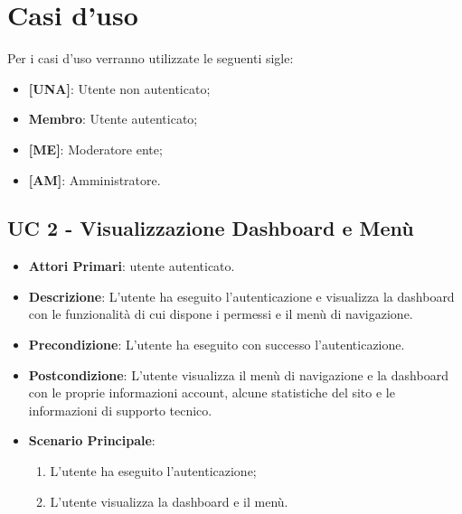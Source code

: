 \section{Casi d'uso}
	Per i casi d'uso verranno utilizzate le seguenti sigle:
	\begin{itemize}
		\item \textbf{[UNA]}: Utente non autenticato;
		\item \textbf{Membro}: Utente autenticato;
		\item \textbf{[ME]}: Moderatore ente;
		\item \textbf{[AM]}: Amministratore.
	\end{itemize}

		

		
		

		\subsection{UC 2 - Visualizzazione Dashboard e Menù}
		
		\begin{itemize}
			\item \textbf{Attori Primari}: utente autenticato.
			\item \textbf{Descrizione}: L'utente ha eseguito l'autenticazione e visualizza la dashboard con le funzionalità di cui dispone i permessi e il menù di navigazione.
			\item \textbf{Precondizione}: L'utente ha eseguito con successo l'autenticazione.
			\item \textbf{Postcondizione}: L'utente visualizza il menù di navigazione e la dashboard con le proprie informazioni account, alcune statistiche del sito e le informazioni di supporto tecnico.
			\item \textbf{Scenario Principale}:
			\begin{enumerate}
				\item L'utente ha eseguito l'autenticazione;
				\item L'utente visualizza la dashboard e il menù.
			\end{enumerate}	
		\end{itemize}


